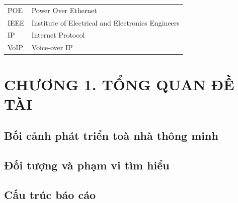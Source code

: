 \documentclass{thesis}
\begin{document}
\begin{tabular}{ l l }
  \hspace{1cm} POE & \hspace{2cm} Power Over Ethernet \\
  \hspace{1cm} IEEE & \hspace{2cm} Institute of Electrical and
  Electronics Engineers \\
  \hspace{1cm} IP & \hspace{2cm} Internet Protocol \\
  \hspace{1cm} VoIP & \hspace{2cm} Voice-over IP \\

\end{tabular}
\newpage

{\let\oldnumberline\numberline
  \renewcommand{\numberline}{Hình~\oldnumberline}
\listoffigures}
\newpage

{\let\oldnumberline\numberline
  \renewcommand{\numberline}{Bảng~\oldnumberline}
\listoftables}
\newpage


\section*{CHƯƠNG 1. TỔNG QUAN ĐỀ TÀI}
{} %

\setcounter{section}{1}
\setcounter{subsection}{0}
\setcounter{figure}{0}
\setcounter{table}{0}

\subsection{Bối cảnh phát triển toà nhà thông minh}
\subsection{Đối tượng và phạm vi tìm hiểu}
\subsection{Cấu trúc báo cáo}
\end{document}

